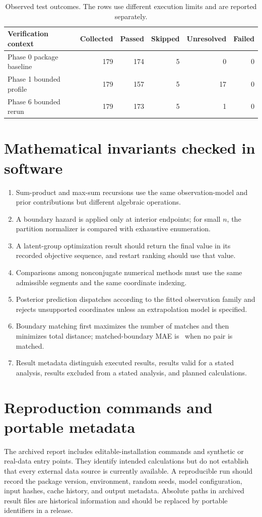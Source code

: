 \begin{table}[H]
\centering
\begin{tabular}{@{}lrrrrr@{}}
\toprule
Verification context & Collected & Passed & Skipped & Unresolved & Failed\\ \midrule
Phase 0 package baseline & 179 & 174 & 5 & 0 & 0\\
Phase 1 bounded profile & 179 & 157 & 5 & 17 & 0\\
Phase 6 bounded rerun & 179 & 173 & 5 & 1 & 0\\
\bottomrule
\end{tabular}
\caption{Observed test outcomes. The rows use different execution limits and are reported
separately.}
\label{tab:test-status}
\end{table}

\section{Mathematical invariants checked in software}
\begin{enumerate}
\item Sum-product and max-sum recursions use the same observation-model and prior contributions but
different algebraic operations.
\item A boundary hazard is applied only at interior endpoints; for small $n$, the partition
normalizer is compared with exhaustive enumeration.
\item A latent-group optimization result should return the final value in its recorded objective
sequence, and restart ranking should use that value.
\item Comparisons among nonconjugate numerical methods must use the same admissible segments and the
same coordinate indexing.
\item Posterior prediction dispatches according to the fitted observation family and rejects
unsupported coordinates unless an extrapolation model is specified.
\item Boundary matching first maximizes the number of matches and then minimizes total distance;
matched-boundary MAE is \NA\ when no pair is matched.
\item Result metadata distinguish executed results, results valid for a stated analysis, results
excluded from a stated analysis, and planned calculations.
\end{enumerate}

\section{Reproduction commands and portable metadata}
The archived report includes editable-installation commands and synthetic or real-data entry
points. They identify intended calculations but do not establish that every external data source
is currently available. A reproducible run should record the package version, environment, random
seeds, model configuration, input hashes, cache history, and output metadata. Absolute paths in
archived result files are historical information and should be replaced by portable identifiers in
a release.

